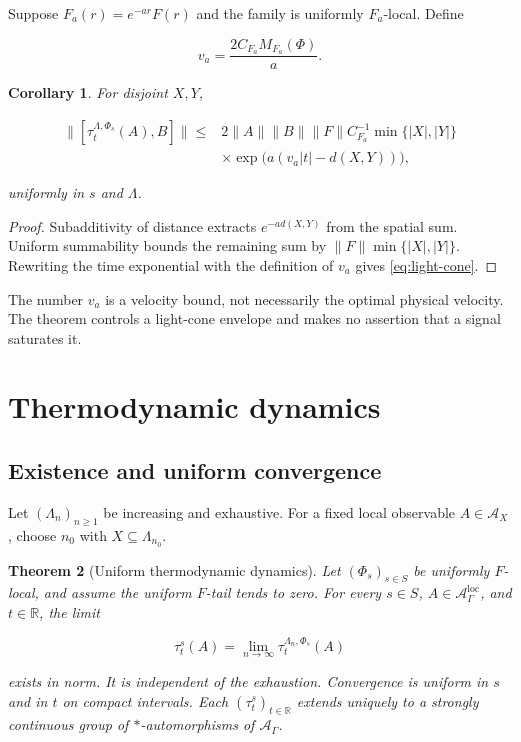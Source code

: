 \documentclass[12pt]{article}
\newtheorem{theorem}{Theorem}[section]
\newtheorem{corollary}[theorem]{Corollary}
\theoremstyle{definition}
\theoremstyle{remark}
\newcommand{\Alg}{\mathcal A}
\begin{document}
Suppose $F_a(r)=e^{-ar}F(r)$ and the family is uniformly $F_a$-local.  Define

\begin{equation}
  v_a=\frac{2C_{F_a}M_{F_a}(\Phi)}{a}.
\end{equation}

\begin{corollary}
For disjoint $X,Y$,

\begin{equation}
\begin{split}
 \|[\tau_t^{\Lambda,\Phi_s}(A),B]\|
 \le{}&
 2\|A\|\|B\|\|F\|C_{F_a}^{-1}
 \min\{|X|,|Y|\} \\
 &\times
 \exp\bigl(a(v_a|t|-d(X,Y))\bigr),
 \label{eq:light-cone}
\end{split}
\end{equation}

uniformly in $s$ and $\Lambda$.
\end{corollary}

\begin{proof}
Subadditivity of distance extracts $e^{-ad(X,Y)}$ from the spatial sum.
Uniform summability bounds the remaining sum by
$\|F\|\min\{|X|,|Y|\}$.  Rewriting the time exponential with the definition
of $v_a$ gives \cref{eq:light-cone}.
\end{proof}

The number $v_a$ is a velocity bound, not necessarily the optimal physical
velocity.  The theorem controls a light-cone envelope and makes no assertion
that a signal saturates it.

\section{Thermodynamic dynamics}

\subsection{Existence and uniform convergence}

Let $(\Lambda_n)_{n\ge1}$ be increasing and exhaustive.  For a fixed local
observable $A\in\Alg_X$, choose $n_0$ with $X\subseteq\Lambda_{n_0}$.

\begin{theorem}[Uniform thermodynamic dynamics]
\label{thm:thermo}
Let $(\Phi_s)_{s\in S}$ be uniformly $F$-local, and assume the uniform
$F$-tail tends to zero.  For every $s\in S$, $A\in\Alg^{\mathrm{loc}}_\Gamma$,
and $t\in\mathbb R$, the limit

\begin{equation}
  \tau_t^s(A)=\lim_{n\to\infty}
  \tau_t^{\Lambda_n,\Phi_s}(A)
  \label{eq:thermo-limit}
\end{equation}

exists in norm.  It is independent of the exhaustion.  Convergence is
uniform in $s$ and in $t$ on compact intervals.  Each
$(\tau_t^s)_{t\in\mathbb R}$ extends uniquely to a strongly continuous group
of $*$-automorphisms of $\Alg_\Gamma$.
\end{theorem}
\end{document}
